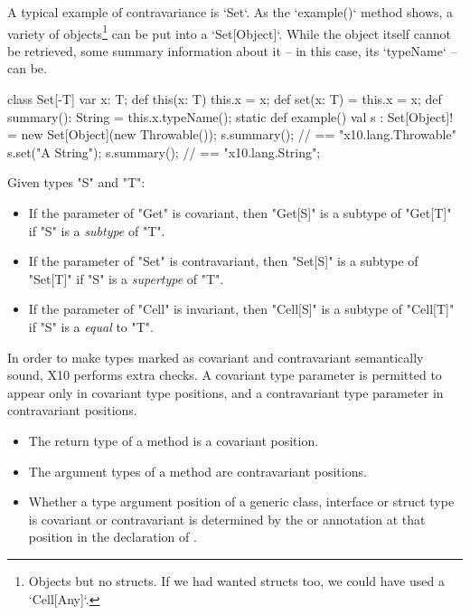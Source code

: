 {A typical example of contravariance is \xcd`Set`.  As the \xcd`example()`
method shows,  a variety of objects\footnote{Objects but no structs.  If we
had wanted structs too, we could have used a \xcd`Cell[Any]`.}  can be put into a
\xcd`Set[Object]`.  While the object itself cannot be retrieved, some summary
information about it -- in this case, its \xcd`typeName` -- can be.  
\begin{xten}
class Set[-T] {
  var x: T;
  def this(x: T) { this.x = x; }
  def set(x: T) = { this.x = x; } 
  def summary(): String = this.x.typeName();
  static def example() {
    val s : Set[Object]! = new Set[Object](new Throwable());
    s.summary(); // == "x10.lang.Throwable"
    s.set("A String");
    s.summary(); // == "x10.lang.String";
  }    
}
\end{xten}
%


Given types \xcd"S" and \xcd"T": 
\begin{itemize}
\item
If the parameter of \xcd"Get" is covariant, then
\xcd"Get[S]" is a subtype of \xcd"Get[T]" if
\xcd"S" is a {\em subtype} of \xcd"T".

\item
If the parameter of \xcd"Set" is contravariant, then
\xcd"Set[S]" is a subtype of \xcd"Set[T]" if
\xcd"S" is a {\em supertype} of \xcd"T".

\item
If the parameter of \xcd"Cell" is invariant, then
\xcd"Cell[S]" is a subtype of \xcd"Cell[T]" if
\xcd"S" is a {\em equal} to \xcd"T".
\end{itemize}


In order to make types marked as covariant and contravariant semantically
sound, X10 performs extra checks.  
A covariant type parameter is permitted to appear only in covariant type positions,
and a contravariant type parameter in contravariant positions. 
\begin{itemize}
\item The return type of a method is a covariant position.
\item The argument types of a method are contravariant positions.
\item Whether a type argument position of a generic class, interface or struct type 
is covariant or contravariant is determined by the \Xcd{+} or \Xcd{-} annotation
at that position in the declaration of .
\end{itemize}

}

